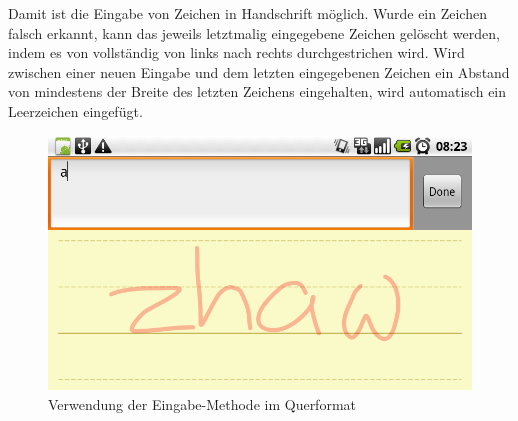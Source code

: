 Damit ist die Eingabe von Zeichen in Handschrift möglich. Wurde ein Zeichen falsch erkannt, kann das jeweils letztmalig eingegebene Zeichen gelöscht werden, indem es von vollständig von links nach rechts durchgestrichen wird. Wird zwischen einer neuen Eingabe und dem letzten eingegebenen Zeichen ein Abstand von mindestens der Breite des letzten Zeichens eingehalten, wird automatisch ein Leerzeichen eingefügt.

\begin{figure}[h!]
   \centering
   \includegraphics[width=\textwidth]{img/manual_landscape} 
   \caption{Verwendung der Eingabe-Methode im Querformat}
   \label{fig:manual_landscape}
\end{figure}



